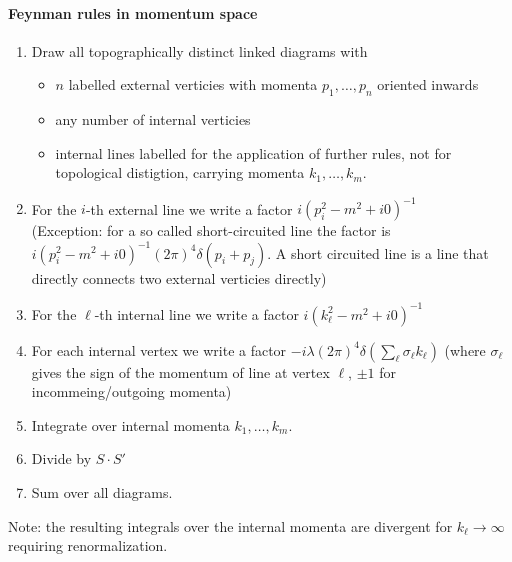 \documentclass{report}
\begin{document}
\paragraph{Feynman rules in momentum space} 
\begin{enumerate}
  \item Draw all topographically distinct linked diagrams with
    \begin{itemize}
      \item $n$ labelled external verticies with momenta $p_1,\ldots,p_n$ oriented inwards
      \item any number of internal verticies
      \item internal lines labelled for the application of further rules, not for topological distigtion, carrying momenta  $k_1,\ldots,k_m$.   
    \end{itemize}
  \item For the $i$-th external line we write a factor $i \left( p_i^2 - m^2 + i 0 \right) ^{-1} $ \\
    (Exception: for a so called short-circuited line the factor is $i \left( p_i^2 - m^2 + i 0 \right)^{-1} \left( 2\pi \right) ^{4} \delta\left( p_i + p_j \right) $. A short circuited line is a line that directly connects two external verticies directly)
  \item For the $\ell$-th internal line we write a factor $i\left( k_\ell^2 - m^2 + i 0 \right) ^{-1} $
  \item For each internal vertex we write a factor $-i\lambda \left( 2\pi \right) ^{4}  \delta\left( \sum_{\ell}^{} \sigma_\ell k_{\ell} \right) $ (where $\sigma_\ell$ gives the sign of the momentum of line at vertex $\ell$, $\pm 1$ for incommeing/outgoing momenta)
  \item Integrate over internal momenta $k_1,\ldots,k_m$.
  \item Divide by $S \cdot  S'$ 
  \item Sum over all diagrams.
\end{enumerate}
Note: the resulting integrals over the internal momenta are divergent for $k_\ell \to \infty$ requiring renormalization.
\end{document}
